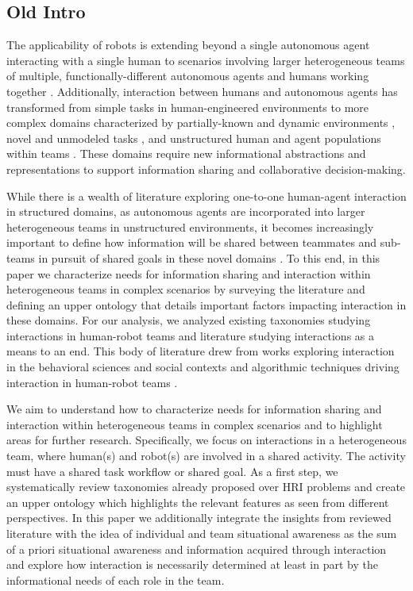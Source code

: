 \documentclass[letterpaper, 10 pt, conference]{ieeeconf}  %
\theoremstyle{definition}
\begin{document}
\subsection{Old Intro}

The applicability of robots is extending beyond a single autonomous agent interacting with a single human to scenarios involving larger heterogeneous teams of multiple, functionally-different autonomous agents and humans working together \cite{Burke2004Miami}.
Additionally, interaction between humans and autonomous agents has transformed from simple tasks in human-engineered environments to more complex domains characterized by partially-known and dynamic environments \cite{Casper2003, Burke2004Miami}, novel and unmodeled tasks \cite{fitzgerald2018human, Cakmak2010}, and unstructured human and agent populations within teams \cite{Thrun1999Minerva, Burgard1999Mesuem,pacchierotti2006design}.
These domains require new informational abstractions and representations to support information sharing and collaborative decision-making. 

While there is a wealth of literature exploring one-to-one human-agent interaction in structured domains, as autonomous agents are incorporated into larger heterogeneous teams in unstructured environments, it becomes increasingly important to define how information will be shared between teammates and sub-teams in pursuit of shared goals in these novel domains \cite{Karma2015, chen2018situation, Korsah2013}. To this end, in this paper we characterize needs for information sharing and interaction within heterogeneous teams in complex scenarios by surveying the literature and defining an upper ontology that details important factors impacting interaction in these domains. For our analysis, we analyzed existing taxonomies studying interactions in human-robot teams and literature studying interactions as a means to an end. This body of literature drew from works exploring interaction in the behavioral sciences \cite{chen2018situation, Endsley1995, Mathieu2000TheIO} and social contexts \cite{Fong2003, Goodrich2007} and algorithmic techniques driving interaction in human-robot teams \cite{Korsah2013, Beer2017}. 

We aim to understand how to characterize needs for information sharing and interaction within heterogeneous teams in complex scenarios and to highlight areas for further research.
Specifically, we focus on interactions in a heterogeneous team, where human(s) and robot(s) are involved in a shared activity.
The activity must have a shared task workflow or shared goal.
As a first step, we systematically review taxonomies already proposed over HRI problems and create an upper ontology which highlights the relevant features as seen from different perspectives.
In this paper we additionally integrate the insights from reviewed literature with the idea of individual and team situational awareness as the sum of a priori situational awareness and information acquired through interaction and explore how interaction is necessarily determined at least in part by the informational needs of each role in the team.
\end{document}
